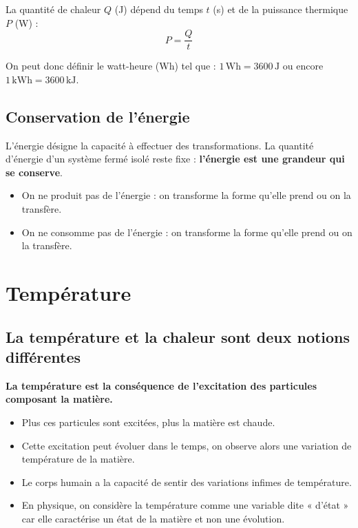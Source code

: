 La quantité de chaleur $Q$ (J) dépend du temps $t$ (s) et de la puissance thermique $P$ (W) :
\begin{equation}
  P = \frac{Q}{t}
\end{equation}

On peut donc définir le watt-heure (Wh) tel que : $1\,\mathrm{Wh} = 3600\,\mathrm{J}$ ou encore $1\,\mathrm{kWh} = 3600\,\mathrm{kJ}$.

\subsection*{Conservation de l'énergie}
L'énergie désigne la capacité à effectuer des transformations.
La quantité d'énergie d'un système fermé isolé reste fixe : \textbf{l'énergie est une grandeur qui se conserve}.

\begin{itemize}
  \item On ne produit pas de l'énergie : on transforme la forme qu'elle prend ou on la transfère.
  \item On ne consomme pas de l'énergie : on transforme la forme qu'elle prend ou on la transfère.
\end{itemize}

\section{Température}

\subsection*{La température et la chaleur sont deux notions différentes}
\textbf{La température est la conséquence de l'excitation des particules composant la matière.}
\begin{itemize}
  \item Plus ces particules sont excitées, plus la matière est chaude.
  \item Cette excitation peut évoluer dans le temps, on observe alors une variation de température de la matière.
  \item Le corps humain a la capacité de sentir des variations infimes de température.
  \item En physique, on considère la température comme une variable dite « d'état » car elle caractérise un état de la matière et non une évolution.
\end{itemize}

